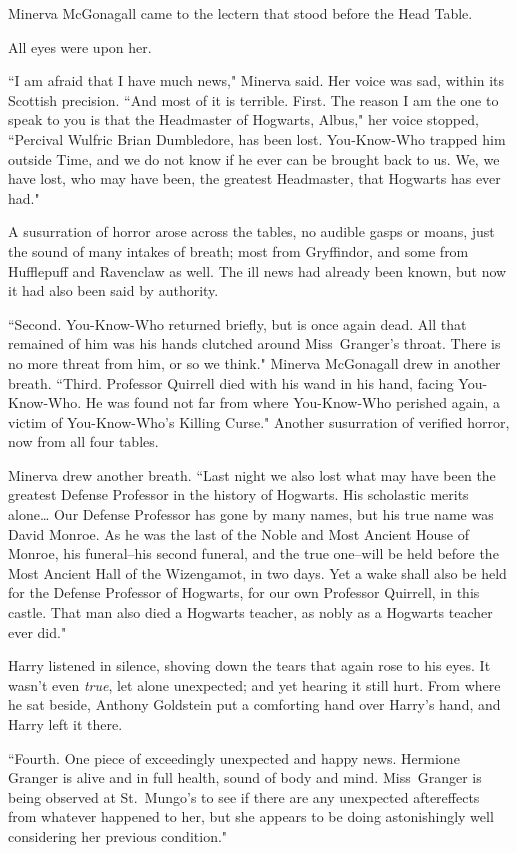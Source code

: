 Minerva McGonagall came to the lectern that stood before the Head Table.

All eyes were upon her.

``I am afraid that I have much news," Minerva said. Her voice was sad, within its Scottish precision. ``And most of it is terrible. First. The reason I am the one to speak to you is that the Headmaster of Hogwarts, Albus," her voice stopped, ``Percival Wulfric Brian Dumbledore, has been lost. You-Know-Who trapped him outside Time, and we do not know if he ever can be brought back to us. We, we have lost, who may have been, the greatest Headmaster, that Hogwarts has ever had."

A susurration of horror arose across the tables, no audible gasps or moans, just the sound of many intakes of breath; most from Gryffindor, and some from Hufflepuff and Ravenclaw as well. The ill news had already been known, but now it had also been said by authority.

``Second. You-Know-Who returned briefly, but is once again dead. All that remained of him was his hands clutched around Miss~Granger's throat. There is no more threat from him, or so we think." Minerva McGonagall drew in another breath. ``Third. Professor Quirrell died with his wand in his hand, facing You-Know-Who. He was found not far from where You-Know-Who perished again, a victim of You-Know-Who's Killing Curse." Another susurration of verified horror, now from all four tables.

Minerva drew another breath. ``Last night we also lost what may have been the greatest Defense Professor in the history of Hogwarts. His scholastic merits alone{\ldots} Our Defense Professor has gone by many names, but his true name was David Monroe. As he was the last of the Noble and Most Ancient House of Monroe, his funeral\---his second funeral, and the true one\---will be held before the Most Ancient Hall of the Wizengamot, in two days. Yet a wake shall also be held for the Defense Professor of Hogwarts, for our own Professor Quirrell, in this castle. That man also died a Hogwarts teacher, as nobly as a Hogwarts teacher ever did."

Harry listened in silence, shoving down the tears that again rose to his eyes. It wasn't even \emph{true}, let alone unexpected; and yet hearing it still hurt. From where he sat beside, Anthony Goldstein put a comforting hand over Harry's hand, and Harry left it there.

``Fourth. One piece of exceedingly unexpected and happy news. Hermione Granger is alive and in full health, sound of body and mind. Miss~Granger is being observed at St.~Mungo's to see if there are any unexpected aftereffects from whatever happened to her, but she appears to be doing astonishingly well considering her previous condition."

